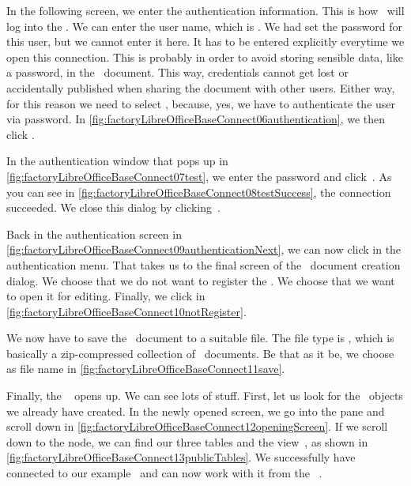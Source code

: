 In the following screen, we enter the authentication information.
This is how \libreofficeBase\ will log into the \dbms.
We can enter the user name, which is .
We had set the password  for this user, but we cannot enter it here.
It has to be entered explicitly everytime we open this connection.
This is probably in order to avoid storing sensible data, like a password, in the \libreofficeBase\ document.
This way, credentials cannot get lost or accidentally published when sharing the document with other users.
Either way, for this reason we need to select , because, yes, we have to authenticate the user  via password.
In \cref{fig:factoryLibreOfficeBaseConnect06authentication}, we then click .

In the authentication window that pops up in \cref{fig:factoryLibreOfficeBaseConnect07test}, we enter the password  and click~.
As you can see in \cref{fig:factoryLibreOfficeBaseConnect08testSuccess}, the connection succeeded.
We close this dialog by clicking~.

Back in the authentication screen in \cref{fig:factoryLibreOfficeBaseConnect09authenticationNext}, we can now click  in the authentication menu.
That takes us to the final screen of the \db\ document creation dialog.
We choose that we do not want to register the \db.
We choose that we want to open it for editing.
Finally, we click  in \cref{fig:factoryLibreOfficeBaseConnect10notRegister}.

We now have to save the \libreofficeBase\ document to a suitable file.
The file type is , which is basically a zip-compressed collection of ~documents.
Be that as it be, we choose  as file name in \cref{fig:factoryLibreOfficeBaseConnect11save}.

Finally, the \db\  opens up.
We can see lots of stuff.
First, let us look for the \db\ objects we already have created.
In the newly opened screen, we go into the  pane and scroll down in \cref{fig:factoryLibreOfficeBaseConnect12openingScreen}.
If we scroll down to the  node, we can find our three tables and the view~, as shown in \cref{fig:factoryLibreOfficeBaseConnect13publicTables}.
We successfully have connected to our example \db\ and can now work with it from the \libreofficeBase\ .%
%
\FloatBarrier%
\endhsection%
%
